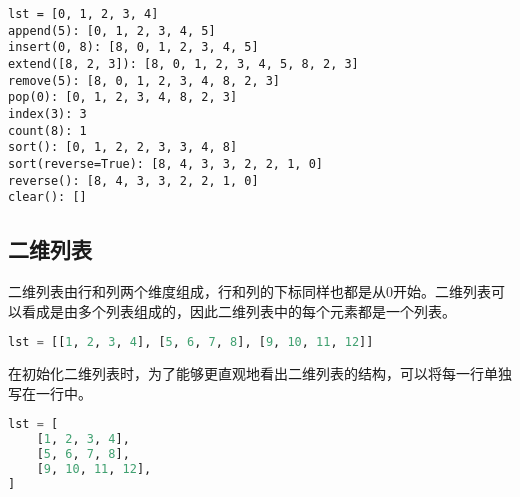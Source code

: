 \begin{tcolorbox}
	\begin{verbatim}
lst = [0, 1, 2, 3, 4]
append(5): [0, 1, 2, 3, 4, 5]
insert(0, 8): [8, 0, 1, 2, 3, 4, 5]
extend([8, 2, 3]): [8, 0, 1, 2, 3, 4, 5, 8, 2, 3]
remove(5): [8, 0, 1, 2, 3, 4, 8, 2, 3]
pop(0): [0, 1, 2, 3, 4, 8, 2, 3]
index(3): 3
count(8): 1
sort(): [0, 1, 2, 2, 3, 3, 4, 8]
sort(reverse=True): [8, 4, 3, 3, 2, 2, 1, 0]
reverse(): [8, 4, 3, 3, 2, 2, 1, 0]
clear(): []
\end{verbatim}
\end{tcolorbox}

\vspace{0.5cm}

\subsection{二维列表}

二维列表由行和列两个维度组成，行和列的下标同样也都是从0开始。二维列表可以看成是由多个列表组成的，因此二维列表中的每个元素都是一个列表。

\vspace{-0.5cm}

\begin{lstlisting}[language=Python]
lst = [[1, 2, 3, 4], [5, 6, 7, 8], [9, 10, 11, 12]]
\end{lstlisting}

\begin{table}[H]
	\centering
\end{table}

在初始化二维列表时，为了能够更直观地看出二维列表的结构，可以将每一行单独写在一行中。

\vspace{-0.5cm}

\begin{lstlisting}[language=Python]
lst = [
	[1, 2, 3, 4],
	[5, 6, 7, 8],
	[9, 10, 11, 12],
]
\end{lstlisting}

\vspace{0.5cm}

